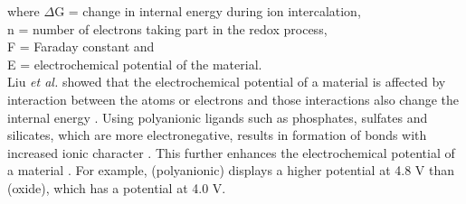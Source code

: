 where $\Delta$G = change in internal energy during ion intercalation,\\
n = number of electrons taking part in the redox process,\\
F = Faraday constant and\\
E = electrochemical potential of the material. \\
Liu \textit{et al.} showed that the electrochemical potential of a material is affected by interaction between the atoms or electrons and those interactions also change the internal energy \cite{liu_understanding_2016}. Using polyanionic ligands such as phosphates, sulfates and silicates, which are more electronegative, results in formation of bonds with increased ionic character \cite{liu_understanding_2016}. This further enhances the electrochemical potential of a material \cite{melot_design_2013}. For example,  (polyanionic) displays a higher potential at 4.8 V than  (oxide), which has a potential at 4.0 V\cite{masquelier_polyanionic_2013}. 

